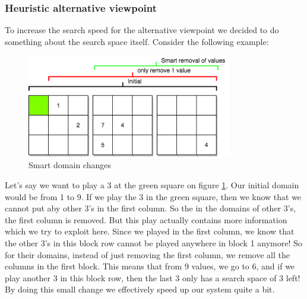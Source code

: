 \documentclass{report}
\begin{document}
\subsubsection{Heuristic alternative viewpoint}
To increase the search speed for the alternative viewpoint we decided to do something about the search space itself. Consider the following example:
\begin{figure}[h!]
\centering
\includegraphics[width=0.8\textwidth]{smartremoval}
\caption{Smart domain changes}
\label{fig:smart_domain}
\end{figure}
Let's say we want to play a 3 at the green square on figure \ref{fig:smart_domain}. Our initial domain would be from 1 to 9. If we play the 3 in the green square, then we know that we cannot put aby other 3's in the first column. So the in the domains of other 3's, the first column is removed. But this play actually contains more information which we try to exploit here. Since we played in the first column, we know that the other 3's in this block row cannot be played anywhere in block 1 anymore! So for their domains, instead of just removing the first column, we remove all the columns in the first block. This means that from 9 values, we go to 6, and if we play another 3 in this block row, then the last 3 only has a search space of 3 left! By doing this small change we effectively speed up our system quite a bit.
\end{document}
